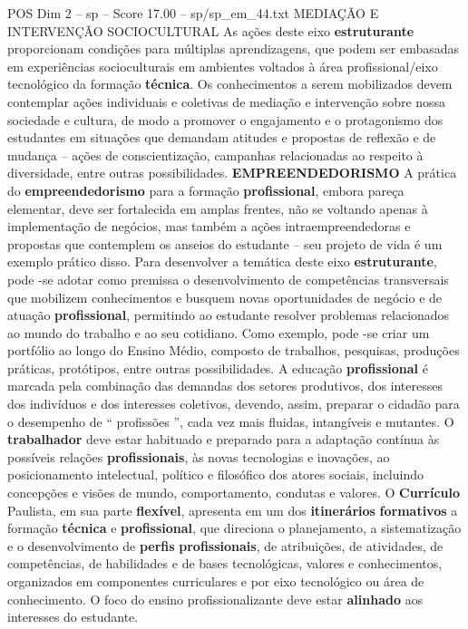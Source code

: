 \begin{textsample}{POS Dim 2 – sp – Score 17.00 – sp/sp\_em\_44.txt}
MEDIAÇÃO E INTERVENÇÃO SOCIOCULTURAL As ações deste eixo \textbf{estruturante} proporcionam condições para múltiplas aprendizagens, que podem ser embasadas em experiências socioculturais em ambientes voltados à área profissional/eixo tecnológico da formação \textbf{técnica}.
Os conhecimentos a serem mobilizados devem contemplar ações individuais e coletivas de mediação e intervenção sobre nossa sociedade e cultura, de modo a promover o engajamento e o protagonismo dos estudantes em situações que demandam atitudes e propostas de reflexão e de mudança – ações de conscientização, campanhas relacionadas ao respeito à diversidade, entre outras possibilidades. \textbf{EMPREENDEDORISMO} A prática do \textbf{empreendedorismo} para a formação \textbf{profissional}, embora pareça elementar, deve ser fortalecida em amplas frentes, não se voltando apenas à implementação de negócios, mas também a ações intraempreendedoras e propostas que contemplem os anseios do estudante – seu projeto de vida é um exemplo prático disso.
Para desenvolver a temática deste eixo \textbf{estruturante}, pode -se adotar como premissa o desenvolvimento de competências transversais que mobilizem conhecimentos e busquem novas oportunidades de negócio e de atuação \textbf{profissional}, permitindo ao estudante resolver problemas relacionados ao mundo do trabalho e ao seu cotidiano.
Como exemplo, pode -se criar um portfólio ao longo do Ensino Médio, composto de trabalhos, pesquisas, produções práticas, protótipos, entre outras possibilidades.
A educação \textbf{profissional} é marcada pela combinação das demandas dos setores produtivos, dos interesses dos indivíduos e dos interesses coletivos, devendo, assim, preparar o cidadão para o desempenho de “ profissões ”, cada vez mais fluidas, intangíveis e mutantes.
O \textbf{trabalhador} deve estar habituado e preparado para a adaptação contínua às possíveis relações \textbf{profissionais}, às novas tecnologias e inovações, ao posicionamento intelectual, político e filosófico dos atores sociais, incluindo concepções e visões de mundo, comportamento, condutas e valores.
O \textbf{Currículo} Paulista, em sua parte \textbf{flexível}, apresenta em um dos \textbf{itinerários} \textbf{formativos} a formação \textbf{técnica} e \textbf{profissional}, que direciona o planejamento, a sistematização e o desenvolvimento de \textbf{perfis} \textbf{profissionais}, de atribuições, de atividades, de competências, de habilidades e de bases tecnológicas, valores e conhecimentos, organizados em componentes curriculares e por eixo tecnológico ou área de conhecimento.
O foco do ensino profissionalizante deve estar \textbf{alinhado} aos interesses do estudante.

\end{textsample}
